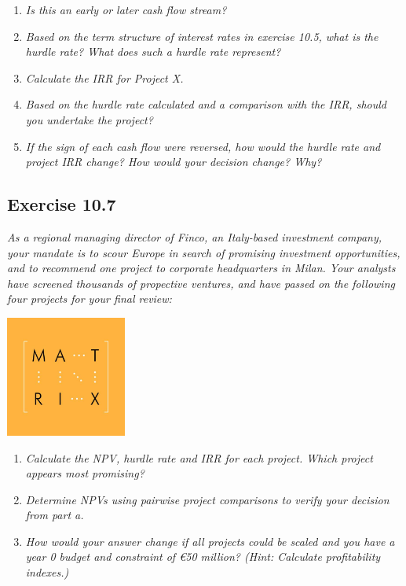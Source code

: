 \documentclass[]{book}
\newcommand{\euro}{€}
\theoremstyle{definition}
\theoremstyle{definition}
\theoremstyle{remark}
\begin{document}
\begin{enumerate}
\def\labelenumi{\alph{enumi}.}
\item
  \emph{Is this an early or later cash flow stream?} \citep[p.339]{book}
\item
  \emph{Based on the term structure of interest rates in exercise 10.5,
  what is the hurdle rate? What does such a hurdle rate represent?}
  \citep[p.339]{book}
\item
  \emph{Calculate the IRR for Project X.} \citep[p.339]{book}
\item
  \emph{Based on the hurdle rate calculated and a comparison with the
  IRR, should you undertake the project?} \citep[p.339]{book}
\item
  \emph{If the sign of each cash flow were reversed, how would the
  hurdle rate and project IRR change? How would your decision change?
  Why?} \citep[p.339]{book}
\end{enumerate}

\subsection{Exercise 10.7}\label{exercise-10.7}

\emph{As a regional managing director of Finco, an Italy-based
investment company, your mandate is to scour Europe in search of
promising investment opportunities, and to recommend one project to
corporate headquarters in Milan. Your analysts have screened thousands
of propective ventures, and have passed on the following four projects
for your final review:} \citep[p.339]{book}

\begin{center}\includegraphics[width=150px]{figures/matrix} \end{center}

\begin{enumerate}
\def\labelenumi{\alph{enumi}.}
\item
  \emph{Calculate the NPV, hurdle rate and IRR for each project. Which
  project appears most promising?} \citep[p.340]{book}
\item
  \emph{Determine NPVs using pairwise project comparisons to verify your
  decision from part a.} \citep[p.340]{book}
\item
  \emph{How would your answer change if all projects could be scaled and
  you have a year 0 budget and constraint of \euro{}50 million? (Hint:
  Calculate profitability indexes.)} \citep[p.340]{book}
\end{enumerate}
\end{document}
